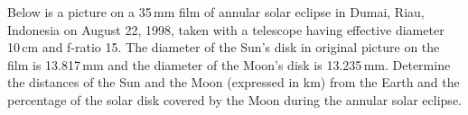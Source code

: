 Below is a picture on a 35\,mm film of annular solar eclipse in Dumai, Riau,
Indonesia on August 22, 1998, taken with a telescope having effective diameter
10\,cm and f-ratio 15. The diameter of the Sun's disk in original picture on
the film is 13.817\,mm and the diameter of the Moon's disk is 13.235\,mm.
Determine the distances of the Sun and the Moon (expressed in km) from the
Earth and the percentage of the solar disk covered by the Moon during the
annular solar eclipse.
